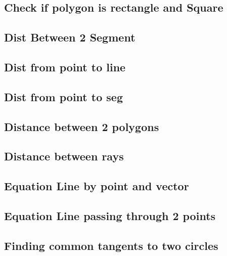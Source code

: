 ﻿\documentclass[10pt,twocolumn]{article}
\newcommand{\codefile}[1]{}}
\begin{document}
\subsection{Check if polygon is rectangle and Square}
\codefile{Geometry/Check if polygon is rectangle and Square.cpp}

\subsection{Dist Between 2 Segment}
\codefile{Geometry/Dist Between 2 Segment.cpp}

\subsection{Dist from point to line}
\codefile{Geometry/Dist from point to line.cpp}

\subsection{Dist from point to seg}
\codefile{Geometry/Dist from point to seg.cpp}

\subsection{Distance between 2 polygons}
\codefile{Geometry/Distance between 2 polygons.cpp}

\subsection{Distance between rays}
\codefile{Geometry/Distance between rays.cpp}

\subsection{Equation Line by point and vector}
\codefile{Geometry/Equation Line by point and vector.cpp}

\subsection{Equation Line passing through 2 points}
\codefile{Geometry/Equation Line passing through 2 points.cpp}

\subsection{Finding common tangents to two circles}
\codefile{Geometry/Finding common tangents to two circles.cpp}
\end{document}
